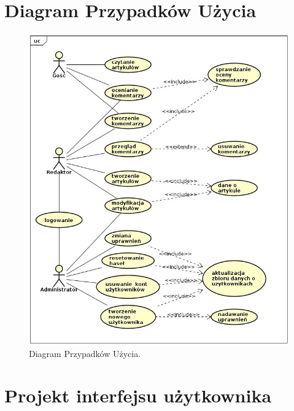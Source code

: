 \documentclass[openright]{xmgr}
\begin{document}
\section{Diagram Przypadków Użycia}
\begin{figure}[!tbh]
\centering
\includegraphics[width=.9\linewidth]{fig/uc}
\caption{Diagram Przypadków Użycia.}
\end{figure}

\section{Projekt interfejsu użytkownika}
\end{document}
